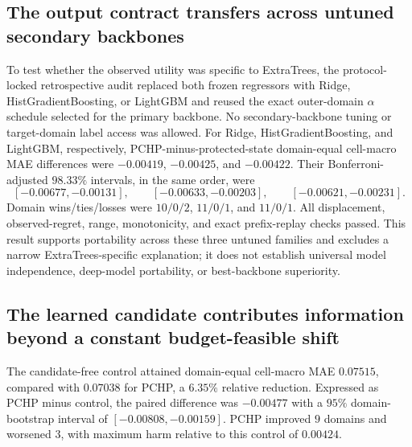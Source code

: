 \documentclass[11pt]{article}
\begin{document}
\subsection{The output contract transfers across untuned secondary backbones}

To test whether the observed utility was specific to ExtraTrees, the protocol-locked retrospective audit replaced both frozen regressors with Ridge, HistGradientBoosting, or LightGBM and reused the exact outer-domain $\alpha$ schedule selected for the primary backbone. No secondary-backbone tuning or target-domain label access was allowed. For Ridge, HistGradientBoosting, and LightGBM, respectively, PCHP-minus-protected-state domain-equal cell-macro MAE differences were $-0.00419$, $-0.00425$, and $-0.00422$. Their Bonferroni-adjusted $98.33\%$ intervals, in the same order, were
\[
[-0.00677,-0.00131],\qquad
[-0.00633,-0.00203],\qquad
[-0.00621,-0.00231].
\]
Domain wins/ties/losses were $10/0/2$, $11/0/1$, and $11/0/1$. All displacement, observed-regret, range, monotonicity, and exact prefix-replay checks passed. This result supports portability across these three untuned families and excludes a narrow ExtraTrees-specific explanation; it does not establish universal model independence, deep-model portability, or best-backbone superiority.

\subsection{The learned candidate contributes information beyond a constant budget-feasible shift}

The candidate-free control attained domain-equal cell-macro MAE $0.07515$, compared with $0.07038$ for PCHP, a $6.35\%$ relative reduction. Expressed as PCHP minus control, the paired difference was $-0.00477$ with a $95\%$ domain-bootstrap interval of $[-0.00808,-0.00159]$. PCHP improved $9$ domains and worsened $3$, with maximum harm relative to this control of $0.00424$.
\end{document}
